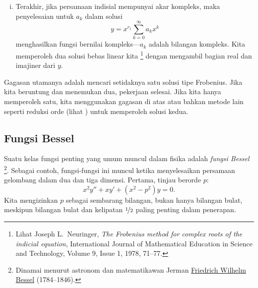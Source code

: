 \begin{enumerate}[(i)]
\begin{equation*}
y_2 = x^{r_2} \sum_{k=0}^\infty b_k x^{k} + C (\ln x) y_1 ,
\end{equation*}
di mana kita mensubstitusikan $y_2$ ke dalam \eqref{eq:frobeniusmethod} dan menyelesaikan untuk
konstanta-konstanta $b_k$ dan $C$.
\item
Terakhir, jika persamaan indisial mempunyai akar kompleks, maka penyelesaian
untuk $a_k$ dalam solusi
\begin{equation*}
y = x^{r_1} \sum_{k=0}^\infty a_k x^{k}
\end{equation*}
menghasilkan fungsi bernilai kompleks---$a_k$ adalah bilangan
kompleks. Kita memperoleh dua solusi bebas
linear kita%
\footnote{Lihat 
Joseph L.\ Neuringer,
\emph{The Frobenius method for complex roots of the indicial equation},
International Journal of Mathematical Education in Science and Technology,
Volume 9, Issue 1, 1978, 71--77.}
dengan mengambil bagian real dan imajiner dari $y$.
\end{enumerate}

Gagasan utamanya adalah mencari setidaknya satu solusi tipe Frobenius. Jika
kita beruntung dan menemukan dua, pekerjaan selesai.
Jika kita hanya memperoleh satu, kita menggunakan gagasan di atas atau bahkan metode lain
seperti reduksi orde (lihat ) untuk
memperoleh solusi kedua.

\subsection{Fungsi Bessel} \label{bessel:subsection}

Suatu kelas fungsi penting yang umum muncul dalam fisika adalah
\emph{fungsi Bessel}%
\footnote{Dinamai menurut
astronom dan matematikawan Jerman
\href{http://en.wikipedia.org/wiki/Friedrich_Bessel}{Friedrich Wilhelm
Bessel} (1784--1846).}.
Sebagai contoh, fungsi-fungsi ini muncul ketika menyelesaikan
persamaan gelombang dalam dua dan tiga dimensi. Pertama, tinjau
\emph{} berorde $p$:
\begin{equation*}
x^2 y'' + xy' + \left(x^2 - p^2\right)y = 0 .
\end{equation*}
Kita mengizinkan $p$ sebagai sembarang bilangan, bukan hanya bilangan bulat, meskipun bilangan bulat
dan kelipatan $\nicefrac{1}{2}$ paling penting dalam penerapan.

